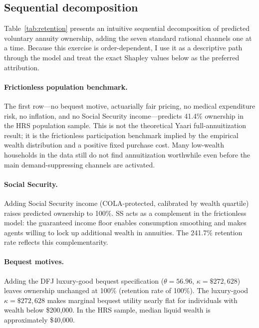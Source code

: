 \documentclass[12pt]{article}
\begin{document}
\subsection{Sequential decomposition}
\label{sec:decomposition}

Table~\ref{tab:retention} presents an intuitive sequential decomposition of predicted voluntary annuity ownership, adding the seven standard rational channels one at a time. Because this exercise is order-dependent, I use it as a descriptive path through the model and treat the exact Shapley values below as the preferred attribution.



\paragraph{Frictionless population benchmark.} The first row---no bequest motive, actuarially fair pricing, no medical expenditure risk, no inflation, and no Social Security income---predicts 41.4\% ownership in the HRS population sample. This is not the theoretical Yaari full-annuitization result; it is the frictionless participation benchmark implied by the empirical wealth distribution and a positive fixed purchase cost. Many low-wealth households in the data still do not find annuitization worthwhile even before the main demand-suppressing channels are activated.

\paragraph{Social Security.} Adding Social Security income (COLA-protected, calibrated by wealth quartile) raises predicted ownership to 100\%. SS acts as a complement in the frictionless model: the guaranteed income floor enables consumption smoothing and makes agents willing to lock up additional wealth in annuities. The 241.7\% retention rate reflects this complementarity.

\paragraph{Bequest motives.} Adding the DFJ luxury-good bequest specification ($\theta = 56.96$, $\kappa = \$272{,}628$) leaves ownership unchanged at 100\% (retention rate of 100\%). The luxury-good $\kappa = \$272{,}628$ makes marginal bequest utility nearly flat for individuals with wealth below \$200,000. In the HRS sample, median liquid wealth is approximately \$40,000.
\end{document}
